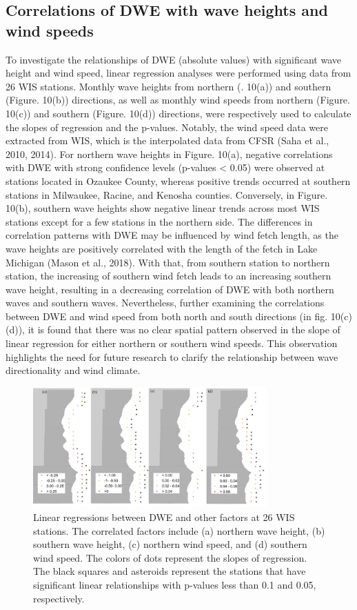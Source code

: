 \subsection{Correlations of DWE with wave heights and wind speeds}
\label{c3_Correlations of DWE with wave heights and wind speeds}
To investigate the relationships of DWE (absolute values) with significant wave height and wind speed, linear regression analyses were performed using data from 26 WIS stations. Monthly wave heights from northern (. 10(a)) and southern (Figure. 10(b)) directions, as well as monthly wind speeds from northern (Figure. 10(c)) and southern (Figure. 10(d)) directions, were respectively used to calculate the slopes of regression and the p-values. Notably, the wind speed data were extracted from WIS, which is the interpolated data from CFSR (Saha et al., 2010, 2014). For northern wave heights in Figure. 10(a), negative correlations with DWE with strong confidence levels (p-values < 0.05) were observed at stations located in Ozaukee County, whereas positive trends occurred at southern stations in Milwaukee, Racine, and Kenosha counties. Conversely, in Figure. 10(b), southern wave heights show negative linear trends across most WIS stations except for a few stations in the northern side. The differences in correlation patterns with DWE may be influenced by wind fetch length, as the wave heights are positively correlated with the length of the fetch in Lake Michigan (Mason et al., 2018). With that, from southern station to northern station, the increasing of southern wind fetch leads to an increasing southern wave height, resulting in a decreasing correlation of DWE with both northern waves and southern waves. Nevertheless, further examining the correlations between DWE and wind speed from both north and south directions (in fig. 10(c)(d)), it is found that there was no clear spatial pattern observed in the slope of linear regression for either northern or southern wind speeds. This observation highlights the need for future research to clarify the relationship between wave directionality and wind climate.

\begin{figure}[htbp]
  \centering
  \includegraphics[width=0.8\textwidth]{chapter3/resources/figure3-10.jpg}
  \caption{Linear regressions between DWE and other factors at 26 WIS stations. The correlated factors include (a) northern wave height, (b) southern wave height, (c) northern wind speed, and (d) southern wind speed. The colors of dots represent the slopes of regression. The black squares and asteroids represent the stations that have significant linear relationships with p-values less than 0.1 and 0.05, respectively.}
  \label{fig:fig3.10}
\end{figure}


